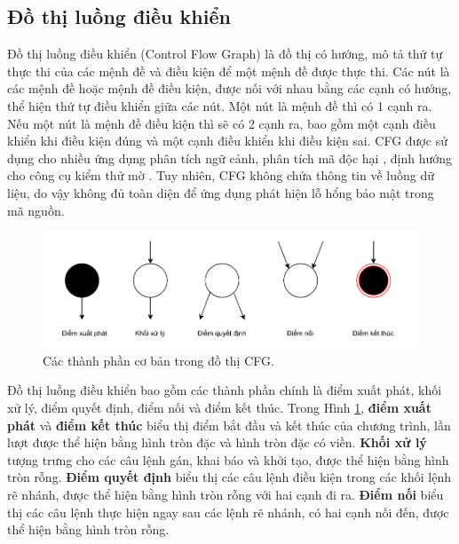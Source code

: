 \subsection{Đồ thị luồng điều khiển}

Đồ thị luồng điều khiển (Control Flow Graph) \cite{yan2019classifying} là đồ thị có hướng, mô tả thứ tự thực thi của các mệnh đề và điều kiện để một mệnh đề được thực thi.
Các nút là các mệnh đề hoặc mệnh đề điều kiện, được nối với nhau bằng các cạnh có hướng, thể hiện thứ tự điều khiển giữa các nút.
Một nút là mệnh đề thì có 1 cạnh ra.
Nếu một nút là mệnh đề điều kiện thì sẽ có 2 cạnh ra, bao gồm một cạnh điều khiển khi điều kiện đúng và một cạnh điều khiển khi điều kiện sai.
CFG được sử dụng cho nhiều ứng dụng phân tích ngữ cảnh, phân tích mã độc hại \cite{gascon2013structural}, định hướng cho công cụ kiểm thử mờ \cite{sparks2007automated}.
Tuy nhiên, CFG không chứa thông tin về luồng dữ liệu, do vậy không đủ toàn diện để ứng dụng phát hiện lỗ hổng bảo mật trong mã nguồn.

\begin{figure}[H]
  \includegraphics[width=1\columnwidth]{figures/c2/c2_cfg_point.drawio.pdf}
  \centering
  \caption{Các thành phần cơ bản trong đồ thị CFG.}
  \label{img:c2_cfg_point}
\end{figure}

Đồ thị luồng điều khiển bao gồm các thành phần chính là điểm xuất phát, khối xử lý, điểm quyết định, điểm nối và điểm kết thúc.
Trong Hình \ref{img:c2_cfg_point}, \textbf{điểm xuất phát} và \textbf{điểm kết thúc} biểu thị điểm bắt đầu và kết thúc của chương trình, lần lượt được thể hiện bằng hình tròn đặc và hình tròn đặc có viền.
\textbf{Khối xử lý} tượng trưng cho các câu lệnh gán, khai báo và khởi tạo, được thể hiện bằng hình tròn rỗng.
\textbf{Điểm quyết định} biểu thị các câu lệnh điều kiện trong các khối lệnh rẽ nhánh, được thể hiện bằng hình tròn rỗng với hai cạnh đi ra.
\textbf{Điểm nối} biểu thị các câu lệnh thực hiện ngay sau các lệnh rẽ nhánh, có hai cạnh nối đến, được thể hiện bằng hình tròn rỗng.

